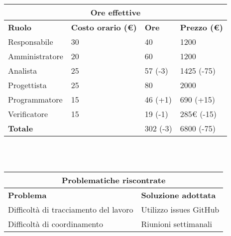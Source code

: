 \documentclass[a4paper, 12pt]{article}
\begin{document}
\begin{center}
    \begin{tabularx}{\textwidth}{|X|X|X|X|}
        \hline
        \multicolumn{4}{|c|}{\textbf{Ore effettive}}\\
        \hline
        \hline
        \textbf{Ruolo} & \textbf{Costo orario (\euro)} & \textbf{Ore} & \textbf{Prezzo (\euro)}\\
        \hline
        Responsabile    & 30 & 40  & 1200\\
        \hline
        Amministratore  & 20 & 60  & 1200\\
        \hline
        Analista        & 25 & 57 (-3)  & 1425 (-75)\\
        \hline
        Progettista     & 25 & 80  & 2000\\
        \hline
        Programmatore   & 15 & 46 (+1)  & 690 (+15)\\
        \hline
        Verificatore    & 15 & 19 (-1)  & 285€ (-15)\\
        \hline
        \hline
        \textbf{Totale} &    & 302 (-3) & 6800 (-75)\\
        \hline
    \end{tabularx}\\[8pt]
    \mbox{}\\
\end{center}

\begin{center}
    \begin{tabularx}{\textwidth}{|X|X|}
        \hline
        \multicolumn{2}{|c|}{\textbf{Problematiche riscontrate}}\\
        \hline
        \hline
        \textbf{Problema} & \textbf{Soluzione adottata}\\
        \hline
        Difficoltà di tracciamento del lavoro & Utilizzo issues GitHub\\
        \hline
        Difficoltà di coordinamento & Riunioni settimanali\\
        \hline
    \end{tabularx}\\[8pt]
    \mbox{}\\
\end{center}
\end{document}
